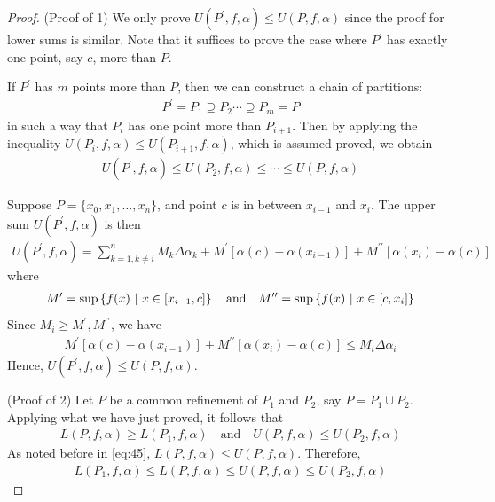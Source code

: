 \documentclass[thmcnt=section, 12pt]{my-elegantbook}
\begin{document}
\begin{proof}
    (Proof of 1) We only prove $U(P^\prime,f,\alpha) \leq U(P,f,\alpha)$ since the proof for lower sums is similar. Note that it suffices to prove the case where $P^\prime$ has exactly one point, say $c$, more than $P$.
    \begin{note}
        If $P^\prime$ has $m$ points more than $P$, then we can construct a chain of partitions:
        \begin{align*}
            P^\prime = P_1 \supseteq P_2 \cdots \supseteq P_m = P
        \end{align*}
        in such a way that $P_i$ has one point more than $P_{i+1}$. Then by applying the inequality $U(P_i,f,\alpha) \leq U(P_{i+1},f,\alpha)$, which is assumed proved, we obtain
        \begin{align*}
            U(P^\prime,f,\alpha) \leq U(P_2,f,\alpha) \leq \cdots \leq U(P,f,\alpha)
        \end{align*}
    \end{note}
    Suppose $P=\{x_0,x_1,\ldots,x_n\}$, and point $c$ is in between $x_{i-1}$ and $x_i$. The upper sum $U(P^\prime,f,\alpha)$ is then 
    \begin{align*}
        U(P^\prime,f,\alpha)
        = \sum_{k=1, k \neq i}^n M_k \Delta \alpha_k
            + M^\prime[\alpha(c) - \alpha(x_{i-1})]
            + M^{\prime\prime}[\alpha(x_{i})-\alpha(c)]
    \end{align*}
    where 
    \begin{align*}
        M^\prime = \sup\left\{ f(x) \ \middle| \ x \in [x_{i-1}, c] \right\}
        \quad\text{and}\quad
        M^{\prime\prime} = \sup\left\{ f(x) \ \middle| \ x \in [c, x_i] \right\}
    \end{align*}
    Since $M_i \geq M^\prime, M^{\prime\prime}$, we have 
    \begin{align*}
        M^\prime[\alpha(c) - \alpha(x_{i-1})]
        + M^{\prime\prime}[\alpha(x_{i})-\alpha(c)]
        \leq M_i \Delta \alpha_i
    \end{align*}
    Hence, $U(P^\prime,f,\alpha) \leq U(P,f,\alpha)$.

    (Proof of 2) Let $P$ be a common refinement of $P_1$ and $P_2$, say $P = P_1 \cup P_2$. Applying what we have just proved, it follows that 
    \begin{align*}
        L(P,f,\alpha) \geq L(P_1,f,\alpha)
        \quad \text{and} \quad
        U(P,f,\alpha) \leq U(P_2,f,\alpha)
    \end{align*}
    As noted before in \eqref{eq:45}, $L(P,f,\alpha) \leq U(P,f,\alpha)$. Therefore, 
    \begin{align*}
        L(P_1,f,\alpha) \leq L(P,f,\alpha)
        \leq U(P,f,\alpha) \leq U(P_2,f,\alpha)
    \end{align*}
\end{proof}
\end{document}
